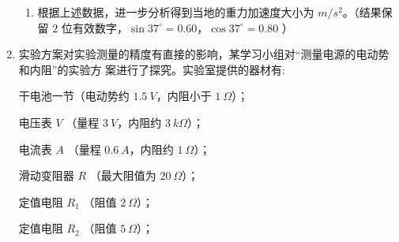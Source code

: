 \begin{enumerate}
\begin{enumerate}
\item 
根据上述数据，进一步分析得到当地的重力加速度大小为 \underlinegap $ m/s^{2} $。（结果保留 $ 2 $ 位有效数字，$ \sin 37 ^{ \circ } =0.60 $，$ \cos 37 ^{ \circ } =0.80 $ ）


\end{enumerate}








\item
实验方案对实验测量的精度有直接的影响，某学习小组对“测量电源的电动势和内阻”的实验方
案进行了探究。实验室提供的器材有:

干电池一节（电动势约 $ 1.5 \ V $，内阻小于 $ 1 \ \Omega $）；


电压表 $ V $ （量程 $ 3 \ V $，内阻约 $ 3 \ k\Omega $）；


电流表 $ A $ （量程 $ 0.6 \ A $，内阻约 $ 1 \ \Omega $）；


滑动变阻器 $ R $ （最大阻值为 $ 20 \ \Omega $）；


定值电阻 $ R_{1} $ （阻值 $ 2 \ \Omega $）；


定值电阻 $ R_{2} $ （阻值 $ 5 \ \Omega $）；


\end{enumerate}
